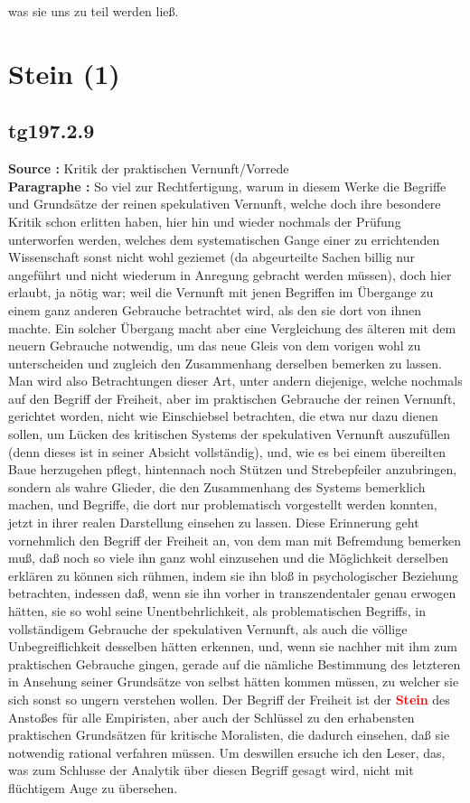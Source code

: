 \documentclass[a4paper,12pt,twoside]{book}
\newcommand{\match}[1]{\textcolor{red}{\textbf{#1}}}
\newcommand{\unnumberedsection}[1]{
	\section*{#1}
	\addcontentsline{toc}{section}{#1}
	\markright{#1}
}
\begin{document}
was sie uns zu teil werden ließ. 
	
	\unnumberedsection{Stein (1)} 
	\subsection*{tg197.2.9} 
	\textbf{Source : }Kritik der praktischen Vernunft/Vorrede\\  
	
	\textbf{Paragraphe : }So viel zur Rechtfertigung, warum in diesem Werke die Begriffe und Grundsätze der reinen spekulativen Vernunft, welche doch ihre besondere Kritik schon erlitten haben, hier hin und wieder nochmals der Prüfung unterworfen werden, welches dem systematischen Gange einer zu errichtenden Wissenschaft sonst nicht wohl geziemet (da abgeurteilte Sachen billig nur angeführt und nicht wiederum in Anregung gebracht werden müssen), doch hier erlaubt, ja nötig war; weil die Vernunft mit jenen Begriffen im Übergange zu einem ganz anderen Gebrauche betrachtet wird, als den sie dort von ihnen machte. Ein solcher Übergang macht aber eine Vergleichung des älteren mit dem neuern Gebrauche notwendig, um das neue Gleis von dem vorigen wohl zu unterscheiden und zugleich den Zusammenhang derselben bemerken zu lassen. Man wird also Betrachtungen dieser Art, unter andern diejenige, welche nochmals auf den Begriff der Freiheit, aber im praktischen Gebrauche der reinen Vernunft, gerichtet worden, nicht wie Einschiebsel betrachten,  die etwa nur dazu dienen sollen, um Lücken des kritischen Systems der spekulativen Vernunft auszufüllen (denn dieses ist in seiner Absicht vollständig), und, wie es bei einem übereilten Baue herzugehen pflegt, hintennach noch Stützen und Strebepfeiler anzubringen, sondern als wahre Glieder, die den Zusammenhang des Systems bemerklich machen, und Begriffe, die dort nur problematisch vorgestellt werden konnten, jetzt in ihrer realen Darstellung einsehen zu lassen. Diese Erinnerung geht vornehmlich den Begriff der Freiheit an, von dem man mit Befremdung bemerken muß, daß noch so viele ihn ganz wohl einzusehen und die Möglichkeit derselben erklären zu können sich rühmen, indem sie ihn bloß in psychologischer Beziehung betrachten, indessen daß, wenn sie ihn vorher in transzendentaler genau erwogen hätten, sie so wohl seine Unentbehrlichkeit, als problematischen Begriffs, in vollständigem Gebrauche der spekulativen Vernunft, als auch die völlige Unbegreiflichkeit desselben hätten erkennen, und, wenn sie nachher mit ihm zum praktischen Gebrauche gingen, gerade auf die nämliche Bestimmung des letzteren in Ansehung seiner Grundsätze von selbst hätten kommen müssen, zu welcher sie sich sonst so ungern verstehen wollen. Der Begriff der Freiheit ist der \match{Stein} des Anstoßes für alle Empiristen, aber auch der Schlüssel zu den erhabensten praktischen Grundsätzen für kritische Moralisten, die dadurch einsehen, daß sie notwendig rational verfahren müssen. Um deswillen ersuche ich den Leser, das, was zum Schlusse der Analytik über diesen Begriff gesagt wird, nicht mit flüchtigem Auge zu übersehen. 
	
\end{document}
